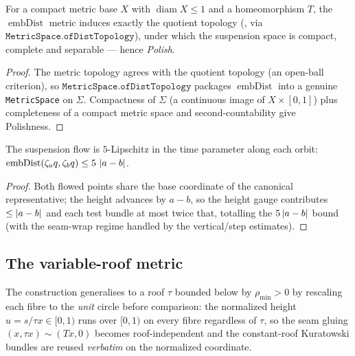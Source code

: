 \begin{theorem}\label{suspensionPolish}
  \leanok
  For a compact metric base $X$ with $\operatorname{diam} X\le 1$ and a homeomorphism $T$, the
  $\operatorname{embDist}$ metric induces exactly the quotient topology
  (, via $\texttt{MetricSpace.ofDistTopology}$), under which
  the suspension space is compact, complete and separable --- hence \emph{Polish}.
\end{theorem}
\begin{proof}\leanok
  The metric topology agrees with the quotient topology (an open-ball criterion), so
  $\texttt{MetricSpace.ofDistTopology}$ packages $\operatorname{embDist}$ into a genuine
  \texttt{MetricSpace} on $\Sigma$. Compactness of $\Sigma$ (a continuous image of $X\times[0,1]$) plus
  completeness of a compact metric space and second-countability give Polishness.
\end{proof}

\begin{theorem}\label{embDist_flow_le}
  \leanok
  The suspension flow is $5$-Lipschitz in the time parameter along each orbit:
  $\operatorname{embDist}(\zeta_a q, \zeta_b q)\le 5\,\left\lvert a - b \right\rvert$.
\end{theorem}
\begin{proof}\leanok
  Both flowed points share the base coordinate of the canonical representative; the height advances by
  $a - b$, so the height gauge contributes $\le\left\lvert a-b \right\rvert$ and each test bundle at most twice that,
  totalling the $5\left\lvert a-b \right\rvert$ bound (with the seam-wrap regime handled by the vertical/step estimates).
\end{proof}

\subsection{The variable-roof metric}

The construction generalises to a roof $\tau$ bounded below by $\rho_{\min} > 0$ by rescaling each
fibre to the \emph{unit} circle before comparison: the normalized height $u = s/\tau x\in[0,1)$ runs
over $[0,1)$ on every fibre regardless of $\tau$, so the seam gluing $(x, \tau x)\sim(Tx, 0)$ becomes
roof-independent and the constant-roof Kuratowski bundles are reused \emph{verbatim} on the normalized
coordinate.

